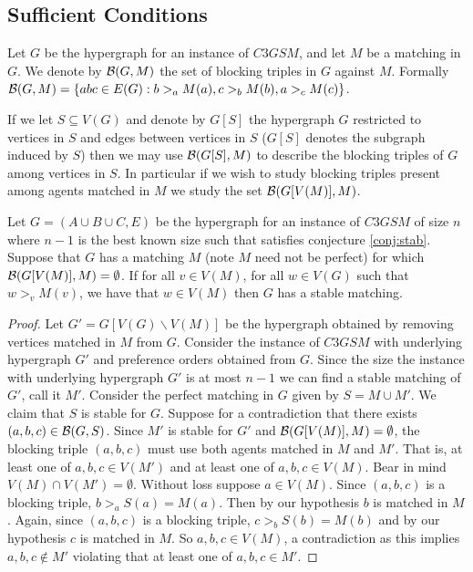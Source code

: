\begin{definition}
\subsection{Sufficient Conditions}\label{subsec:sufficient}
\begin{definition}
Let $G$ be the hypergraph for an instance of $C3GSM$, and let $M$ be a matching in $G$. We denote by $\mathcal{B}(G,M)$ the set of blocking triples in $G$ against $M$. Formally $\mathcal{B}(G,M) = \{abc \in E(G): b>_a M(a), c>_b M(b), a>_c M(c)\}$.
\end{definition}
\begin{note}
If we let $S \subseteq V(G)$ and denote by $G[S]$ the hypergraph $G$ restricted to vertices in $S$ and edges between vertices in $S$ ($G[S]$ denotes the subgraph induced by $S$) then we may use $\mathcal{B}(G[S],M)$ to describe the blocking triples of $G$ among vertices in $S$. In particular if we wish to study blocking triples present among agents matched in $M$ we study the set $\mathcal{B}(G[V(M)], M)$.
\end{note}
\begin{lemma}\label{lemma:partialstab}
Let $G = (A\cup B \cup C, E)$ be the hypergraph for an instance of $C3GSM$ of size $n$ where $n-1$ is the best known size such that  satisfies conjecture \ref{conj:stab}. Suppose that $G$ has a matching $M$ (note $M$ need not be perfect) for which $\mathcal{B}(G[V(M)],M) = \emptyset$. If for all  $v \in V(M)$, for all $w \in V(G)$ such that $w >_v M(v)$, we have that $w \in V(M)$ then $G$ has a stable matching.
\end{lemma}
\begin{proof}
Let $G' = G[V(G)\backslash V(M)]$ be the hypergraph obtained by removing vertices matched in $M$ from $G$. Consider the instance of $C3GSM$ with underlying hypergraph $G'$ and preference orders obtained from $G$. Since the size the instance with underlying hypergraph $G'$ is at most $n-1$ we can find a stable matching of $G'$, call it $M'$. Consider the perfect matching in $G$ given by $S = M \cup M'$. We claim that $S$ is stable for $G$. Suppose for a contradiction that there exists $(a,b,c) \in \mathcal{B}(G, S)$. Since $M'$ is stable for $G'$ and $\mathcal{B}(G[V(M)], M) = \emptyset$, the blocking triple $(a,b,c)$ must use both agents matched in $M$ and $M'$. That is, at least one of $a,b,c \in V(M')$ and at least one of $a,b,c \in V(M)$. Bear in mind $V(M) \cap V(M') = \emptyset$. Without loss suppose $a \in V(M)$. Since $(a,b,c)$ is a blocking triple, $b >_a S(a) = M(a)$. Then by our hypothesis $b$ is matched in $M$. Again, since $(a,b,c)$ is a blocking triple, $c >_b S(b) = M(b)$ and by our hypothesis $c$ is matched in $M$. So $a,b,c \in V(M)$, a contradiction as this implies $a,b,c \not\in M'$ violating that at least one of $a,b,c \in M'$.

\end{proof}
\end{definition}

